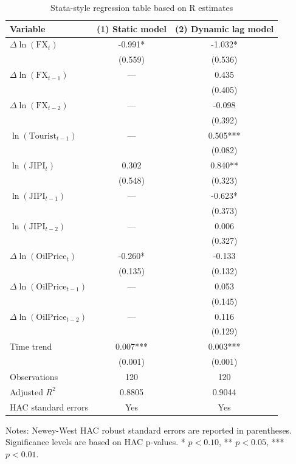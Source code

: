 \begin{table}[H]
\centering
\caption{Stata-style regression table based on R estimates}
\label{tab:main-results}
\small
\begin{tabular}{lcc}
\toprule
Variable & (1) Static model & (2) Dynamic lag model \\
\midrule
$\Delta \ln(\mathrm{FX}_t)$ & -0.991* & -1.032* \\
 & (0.559) & (0.536) \\
$\Delta \ln(\mathrm{FX}_{t-1})$ & --- & 0.435 \\
 &  & (0.405) \\
$\Delta \ln(\mathrm{FX}_{t-2})$ & --- & -0.098 \\
 &  & (0.392) \\
$\ln(\mathrm{Tourist}_{t-1})$ & --- & 0.505*** \\
 &  & (0.082) \\
$\ln(\mathrm{JIPI}_t)$ & 0.302 & 0.840** \\
 & (0.548) & (0.323) \\
$\ln(\mathrm{JIPI}_{t-1})$ & --- & -0.623* \\
 &  & (0.373) \\
$\ln(\mathrm{JIPI}_{t-2})$ & --- & 0.006 \\
 &  & (0.327) \\
$\Delta \ln(\mathrm{OilPrice}_t)$ & -0.260* & -0.133 \\
 & (0.135) & (0.132) \\
$\Delta \ln(\mathrm{OilPrice}_{t-1})$ & --- & 0.053 \\
 &  & (0.145) \\
$\Delta \ln(\mathrm{OilPrice}_{t-2})$ & --- & 0.116 \\
 &  & (0.129) \\
Time trend & 0.007*** & 0.003*** \\
 & (0.001) & (0.001) \\
Observations & 120 & 120 \\
Adjusted $R^2$ & 0.8805 & 0.9044 \\
HAC standard errors & Yes & Yes \\
\bottomrule
\end{tabular}
\vspace{0.4em}
\begin{minipage}{0.92\textwidth}
\footnotesize
Notes: Newey-West HAC robust standard errors are reported in parentheses. Significance levels are based on HAC p-values. * $p<0.10$, ** $p<0.05$, *** $p<0.01$.
\end{minipage}
\end{table}

